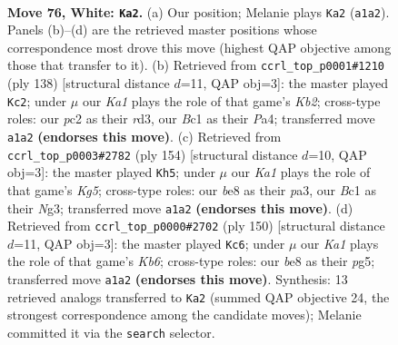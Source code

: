 \documentclass[11pt]{article}
\begin{document}
\clearpage

\begin{figure}[p]\centering
\begin{subfigure}{0.46\textwidth}\centering
\resizebox{\linewidth}{!}{%
\newchessgame
\chessboard[
  setfen={4b2k/8/R7/8/1P6/8/2p3r1/K1B5 w - - 4 76},
  showmover=false,
  pgfstyle=straightmove, color=movearrow, markmove={a1-a2}
]}
\caption{}
\end{subfigure}\hfill
\begin{subfigure}{0.46\textwidth}\centering
\resizebox{\linewidth}{!}{%
\newchessgame
\chessboard[
  setfen={8/k7/3b4/8/P7/3r4/1K4R1/8 w - - 0 70},
  showmover=false,
  pgfstyle=straightmove, color=movearrow, markmove={b2-c2}
]}
\caption{}
\end{subfigure}
\\[4pt]
\begin{subfigure}{0.46\textwidth}\centering
\resizebox{\linewidth}{!}{%
\newchessgame
\chessboard[
  setfen={5k2/8/8/1R4K1/8/p5N1/8/r7 w - - 5 78},
  showmover=false,
  pgfstyle=straightmove, color=movearrow, markmove={g5-h5}
]}
\caption{}
\end{subfigure}\hfill
\begin{subfigure}{0.46\textwidth}\centering
\resizebox{\linewidth}{!}{%
\newchessgame
\chessboard[
  setfen={8/4r3/1K3R2/6pB/8/7k/8/8 w - - 6 76},
  showmover=false,
  pgfstyle=straightmove, color=movearrow, markmove={b6-c6}
]}
\caption{}
\end{subfigure}
\caption{\textbf{Move 76, White: \texttt{Ka2}.} (a) Our position; Melanie plays \texttt{Ka2} (\texttt{a1a2}). Panels (b)--(d) are the retrieved master positions whose correspondence most drove this move (highest QAP objective among those that transfer to it). (b) Retrieved from \texttt{ccrl\_top\_p0001\#1210} (ply 138) [structural distance $d$=11, QAP obj=3]: the master played \texttt{Kc2}; under $\mu$ our \emph{Ka1} plays the role of that game's \emph{Kb2}; cross-type roles: our \emph{p}c2 as their \emph{r}d3, our \emph{B}c1 as their \emph{P}a4; transferred move \texttt{a1a2} \textbf{(endorses this move)}. (c) Retrieved from \texttt{ccrl\_top\_p0003\#2782} (ply 154) [structural distance $d$=10, QAP obj=3]: the master played \texttt{Kh5}; under $\mu$ our \emph{Ka1} plays the role of that game's \emph{Kg5}; cross-type roles: our \emph{b}e8 as their \emph{p}a3, our \emph{B}c1 as their \emph{N}g3; transferred move \texttt{a1a2} \textbf{(endorses this move)}. (d) Retrieved from \texttt{ccrl\_top\_p0000\#2702} (ply 150) [structural distance $d$=11, QAP obj=3]: the master played \texttt{Kc6}; under $\mu$ our \emph{Ka1} plays the role of that game's \emph{Kb6}; cross-type roles: our \emph{b}e8 as their \emph{p}g5; transferred move \texttt{a1a2} \textbf{(endorses this move)}. Synthesis: 13 retrieved analogs transferred to \texttt{Ka2} (summed QAP objective 24, the strongest correspondence among the candidate moves); Melanie committed it via the \texttt{search} selector.}
\label{fig:thought-m150}
\end{figure}
\end{document}
